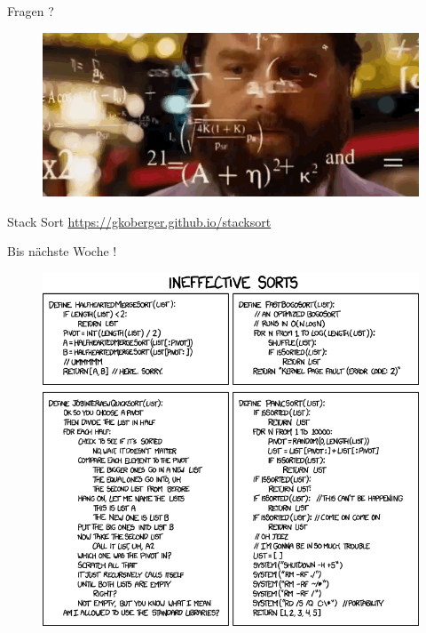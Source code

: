 \documentclass[18pt]{beamer}
\begin{document}
\appendix
\beginbackup

\begin{frame}{Fragen ?}
    \begin{figure}
        \includegraphics[scale=.5]{img/formulas.png}
    \end{figure}
\end{frame}

\begin{frame}{Stack Sort}
    \url{https://gkoberger.github.io/stacksort}
\end{frame}

\begin{frame}{Bis nächste Woche !}
    \begin{figure}
        \includegraphics[scale=.3]{img/ineffective_sorts.png}
    \end{figure}
\end{frame}

\backupend
\end{document}
